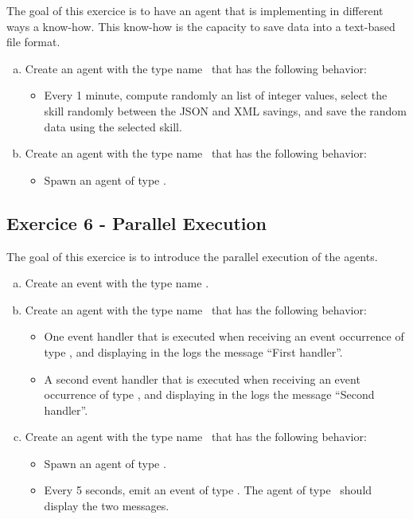 \documentclass[english,nodocumentinfo,nopubpage]{utbmciadreport}
\begin{document}
The goal of this exercice is to have an agent that is implementing in different ways a know-how. This know-how is the capacity to save data into a text-based file format.

\begin{enumerate}[a)]
\item Create an agent with the type name \ that has the following behavior:
	\begin{itemize}
	\item Every 1 minute, compute randomly an list of integer values, select the skill randomly between the JSON and XML savings, and save the random data using the selected skill.
	\end{itemize}
\item Create an agent with the type name \ that has the following behavior:
	\begin{itemize}
	\item Spawn an agent of type .
	\end{itemize}
\end{enumerate}

\subsection{Exercice 6 - Parallel Execution}

The goal of this exercice is to introduce the parallel execution of the agents.

\begin{enumerate}[a)]
\item Create an event with the type name .
\item Create an agent with the type name \ that has the following behavior:
	\begin{itemize}
	\item One event handler that is executed when receiving an event occurrence of type , and displaying in the logs the message ``First handler''.
	\item A second event handler that is executed when receiving an event occurrence of type , and displaying in the logs the message ``Second handler''.
	\end{itemize}
\item Create an agent with the type name \ that has the following behavior:
	\begin{itemize}
	\item Spawn an agent of type .
	\item Every 5 seconds, emit an event of type . The agent of type \ should display the two messages.
	\end{itemize}
\end{enumerate}
\end{document}
